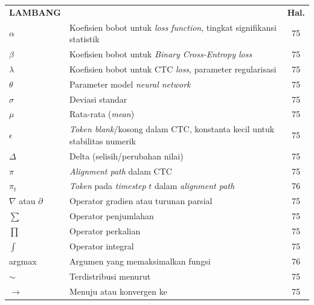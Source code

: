 \begin{longtable}{@{} l >{\raggedright\arraybackslash}p{6.5cm} c @{}}
\multicolumn{1}{c}{\textbf{LAMBANG}} & \multicolumn{1}{c}{\textbf{NAMA}} & \multicolumn{1}{c}{\textbf{Hal.}} \\



$\alpha$ & Koefisien bobot untuk \textit{loss function}, tingkat signifikansi statistik & 75 \\
$\beta$ & Koefisien bobot untuk \textit{Binary Cross-Entropy loss} & 75 \\
$\lambda$ & Koefisien bobot untuk CTC \textit{loss}, parameter regularisasi & 75 \\
$\theta$ & Parameter model \textit{neural network} & 75 \\
$\sigma$ & Deviasi standar & 75 \\
$\mu$ & Rata-rata (\textit{mean}) & 75 \\
$\epsilon$ & \textit{Token blank}/kosong dalam CTC, konstanta kecil untuk stabilitas numerik & 75 \\
$\Delta$ & Delta (selisih/perubahan nilai) & 75 \\
$\pi$ & \textit{Alignment path} dalam CTC & 75 \\
$\pi_t$ & \textit{Token} pada \textit{timestep} $t$ dalam \textit{alignment path} & 76 \\[1ex]


$\nabla$ atau $\partial$ & Operator gradien atau turunan parsial & 75 \\
$\sum$ & Operator penjumlahan & 75 \\
$\prod$ & Operator perkalian & 75 \\
$\int$ & Operator integral & 75 \\
argmax & Argumen yang memaksimalkan fungsi & 76 \\
$\sim$ & Terdistribusi menurut & 75 \\
$\to$ & Menuju atau konvergen ke & 75 \\[1ex]



\end{longtable}
